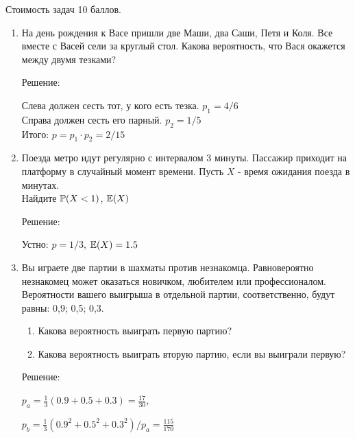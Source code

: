 \documentclass[12pt, a4paper]{article}\usepackage[]{graphicx}\usepackage[]{color}
\begin{document}
Стоимость задач 10 баллов.

\begin{enumerate}
\item На день рождения к Васе пришли две Маши, два Саши, Петя и Коля. Все вместе с Васей сели за круглый стол. Какова вероятность, что Вася окажется между двумя тезками?

Решение:

Слева должен сесть тот, у кого есть тезка. $p_{1}=4/6$\\
Справа должен сесть его парный. $p_{2}=1/5$ \\
Итого: $p=p_{1}\cdot p_{2}=2/15$

\item Поезда метро идут регулярно с интервалом 3 минуты. Пассажир
приходит на платформу в случайный момент времени. Пусть $X$ -
время ожидания поезда в минутах. \\
Найдите $\P(X<1)$, $\E(X)$

Решение:

Устно: $p=1/3$, $\E(X)=1.5$


\item Вы играете две партии в шахматы против незнакомца. Равновероятно
незнакомец может оказаться новичком, любителем или профессионалом.
Вероятности вашего выигрыша в отдельной партии, соответственно,
будут равны: 0,9; 0,5; 0,3.
\begin{enumerate}
\item Какова вероятность выиграть первую партию?
\item Какова вероятность выиграть вторую партию, если вы выиграли
первую?
\end{enumerate}

Решение:

$p_{a}=\frac{1}{3}(0.9+0.5+0.3)=\frac{17}{30}$,

$p_{b}=\frac{1}{3}(0.9^{2}+0.5^{2}+0.3^{2})/p_{a}=\frac{115}{170}$


\end{enumerate}
\end{document}
